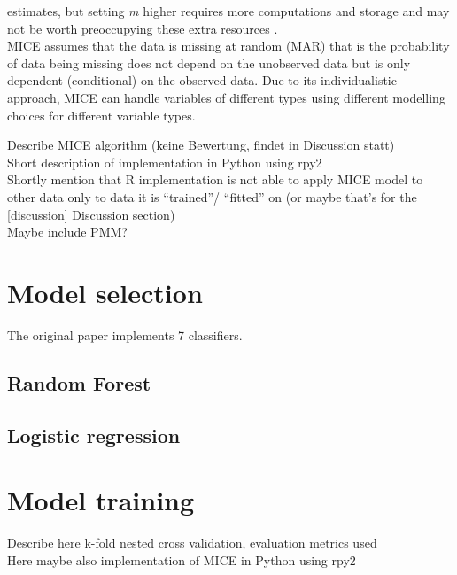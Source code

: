 estimates, but setting \textit{m} higher requires more computations and storage 
and may not be worth preoccupying these extra resources \cite{RN144}.
\\
MICE assumes that the data is missing at random (MAR) that is the probability 
of data being missing does not depend on the unobserved data but is only 
dependent (conditional) on the observed data. Due to its individualistic 
approach, MICE can handle variables of different types using different 
modelling choices for different variable types.
\begin{changemargin}{50pt}{50pt}
Describe MICE algorithm (keine Bewertung, findet in Discussion statt)
\\
Short description of implementation in Python using rpy2
\\
Shortly mention that R implementation is not able to apply MICE model to other 
data only to data it is ``trained''/ ``fitted'' on (or maybe that's for the 
\ref{discussion} Discussion section)
\\
Maybe include PMM?
\end{changemargin}
\section{Model selection}
The original paper \cite{RN127} implements 7 classifiers.
\subsection{Random Forest}
\subsection{Logistic regression}
\section{Model training}
\begin{changemargin}{50pt}{50pt}
 Describe here k-fold nested cross validation, evaluation metrics used
 \\
 Here maybe also implementation of MICE in Python using rpy2
\end{changemargin}
